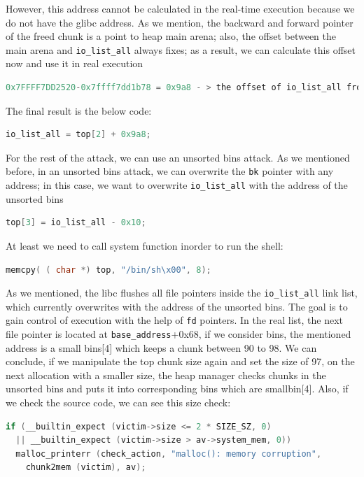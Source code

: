 \documentclass{masterthesis}
\newcommand*\libc{glibc}
\newcommand*\ub{unsorted bins}
\newcommand*\sbs{small bins}
\begin{document}
However, this address cannot be calculated in the real-time execution because we do not have the \libc{} address. As we mention, the backward and forward pointer of the freed chunk is a point to heap main arena; also, the offset between the main arena and \lstinline{io_list_all} always fixes; as a result, we can calculate this offset now and use it in real execution
\begin{lstlisting}[language=c,frame=tlrb]
0x7FFFF7DD2520-0x7ffff7dd1b78 = 0x9a8 - > the offset of io_list_all from main arena
\end{lstlisting}

The final result is the below code:

\begin{lstlisting}[language=c,frame=tlrb]
io_list_all = top[2] + 0x9a8;
\end{lstlisting}

For the rest of the attack, we can use an \ub{} attack. As we mentioned before, in an \ub{} attack, we can overwrite the \lstinline{bk} pointer with any address; in this case, we want to overwrite \lstinline{io_list_all} with the address of the \ub{}

\begin{lstlisting}[language=c,frame=tlrb]
top[3] = io_list_all - 0x10;
\end{lstlisting}

At least we need to call system function inorder to run the shell:

\begin{lstlisting}[language=c,frame=tlrb]
memcpy( ( char *) top, "/bin/sh\x00", 8);
\end{lstlisting}


As we mentioned, the libc flushes all file pointers inside the \lstinline{io_list_all} link list, which currently overwrites with the address of the \ub{}.
The goal is to gain control of execution with the help of \lstinline{fd} pointers. In the real list, the next file pointer is located at \lstinline{base_address}+0x68, if we consider bins, the mentioned address is a \sbs{}[4] which keeps a chunk between 90 to 98. We can conclude, if we manipulate the top chunk size again and set the size of 97, on the next allocation with a smaller size, the heap manager checks chunks in the \ub{} and puts it into corresponding bins which are smallbin[4]. Also, if we check the source code, we can see this size check:

\begin{lstlisting}[language=c,frame=tlrb]
if (__builtin_expect (victim->size <= 2 * SIZE_SZ, 0)
  || __builtin_expect (victim->size > av->system_mem, 0))
  malloc_printerr (check_action, "malloc(): memory corruption",
    chunk2mem (victim), av);
\end{lstlisting}
\end{document}
